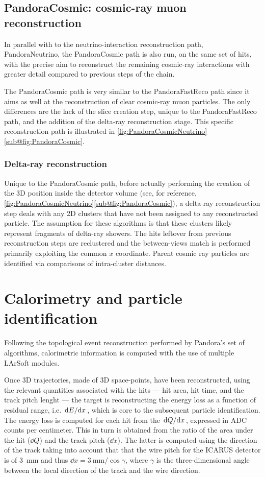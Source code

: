 \subsection{PandoraCosmic: cosmic-ray muon reconstruction}

In parallel with to the neutrino-interaction reconstruction path, PandoraNeutrino, the PandoraCosmic path is also run, on the same set of hits, with the precise aim to reconstruct the remaining cosmic-ray interactions with greater detail compared to previous steps of the chain. 

The PandoraCosmic path is very similar to the PandoraFastReco path since it aims as well at the reconstruction of clear cosmic-ray muon particles. The only differences are the lack of the slice creation step, unique to the PandoraFastReco path, and the addition of the delta-ray reconstruction stage. This specific reconstruction path is illustrated in \autoref{fig:PandoraCosmicNeutrino}\ref{sub@fig:PandoraCosmic}. 

\subsubsection{Delta-ray reconstruction}

Unique to the PandoraCosmic path, before actually performing the creation of the 3D position inside the detector volume (see, for reference, \autoref{fig:PandoraCosmicNeutrino}\ref{sub@fig:PandoraCosmic}), a delta-ray reconstruction step deals with any 2D clusters that have not been assigned to any reconstructed particle. The assumption for these algorithms is that these clusters likely represent fragments of delta-ray showers. The hits leftover from previous reconstruction steps are reclustered and the between-views match is performed primarily exploiting the common $x$ coordinate. Parent cosmic ray particles are identified via comparisons of intra-cluster distances. 

\section{Calorimetry and particle identification} 

Following the topological event reconstruction performed by Pandora's set of algorithms, calorimetric information is computed with the use of multiple LArSoft modules. 

Once 3D trajectories, made of 3D space-points, have been reconstructed, using the relevant quantities associated with the hits --- hit area, hit time, and the track pitch lenght --- the target is reconstructing the energy loss as a function of residual range, i.e. $\dv*{E}{x}$, which is core to the  subsequent particle identification. The energy loss is computed for each hit from the $\dv*{Q}{x}$, expressed in ADC counts per centimeter. This in turn is obtained from the ratio of the area under the hit ($\dd Q$) and the track pitch ($\dd x$).  The latter is computed using the direction of the track taking into account that that the wire pitch for the ICARUS detector is of \SI{3}{\mm} and thus $\dd x = \SI{3}{\mm}/\cos\gamma$, where $\gamma$ is the three-dimensional angle between the local direction of the track and the wire direction. 

